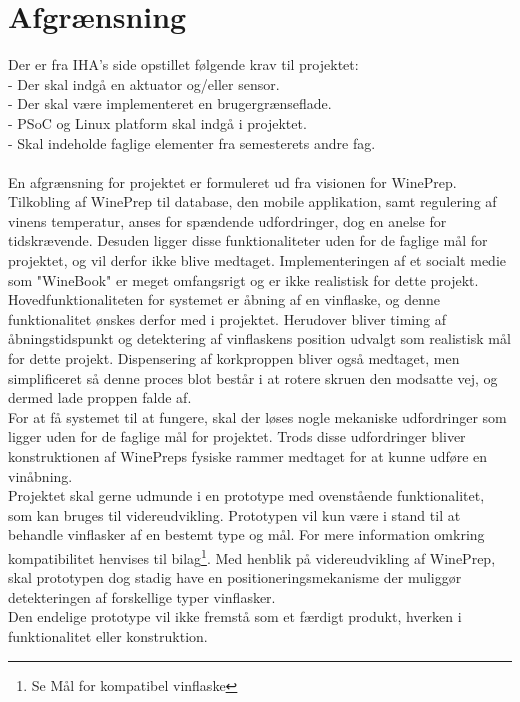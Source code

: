 \chapter{Afgrænsning}
\label{chp:Afg}
Der er fra IHA's side opstillet følgende krav til projektet:\\
- Der skal indgå en aktuator og/eller sensor.\\
- Der skal være implementeret en brugergrænseflade.\\
- PSoC og Linux platform skal indgå i projektet.\\
- Skal indeholde faglige elementer fra semesterets andre fag.\\
\\
En afgrænsning for projektet er formuleret ud fra visionen for WinePrep. Tilkobling af WinePrep til database, den mobile applikation, samt regulering af vinens temperatur, anses for spændende udfordringer, dog en anelse for tidskrævende. Desuden ligger disse funktionaliteter uden for de faglige mål for projektet, og vil derfor ikke blive medtaget. Implementeringen af et socialt medie som "WineBook" er meget omfangsrigt og er ikke realistisk for dette projekt.\\

Hovedfunktionaliteten for systemet er åbning af en vinflaske, og denne funktionalitet ønskes derfor med i projektet. Herudover bliver timing af åbningstidspunkt og detektering af vinflaskens position udvalgt som realistisk mål for dette projekt. Dispensering af korkproppen bliver også medtaget, men simplificeret så denne proces blot består i at rotere skruen den modsatte vej, og dermed lade proppen falde af.\\

For at få systemet til at fungere, skal der løses nogle mekaniske udfordringer som ligger uden for de faglige mål for projektet. Trods disse udfordringer bliver konstruktionen af WinePreps fysiske rammer medtaget for at kunne udføre en vinåbning.\\

Projektet skal gerne udmunde i en prototype med ovenstående funktionalitet, som kan bruges til videreudvikling. Prototypen vil kun være i stand til at behandle vinflasker af en bestemt type og mål. For mere information omkring kompatibilitet henvises til bilag\footnote{Se Mål for kompatibel vinflaske}. Med henblik på videreudvikling af WinePrep, skal prototypen dog stadig have en positioneringsmekanisme der muliggør detekteringen af forskellige typer vinflasker.\\ 

Den endelige prototype vil ikke fremstå som et færdigt produkt, hverken i funktionalitet eller konstruktion.